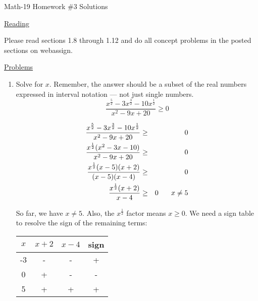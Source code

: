 \documentclass[letterpaper,12pt,fleqn]{article}
\begin{document}
\begin{center}
\Large Math-19 Homework \#3 Solutions
\end{center}

\vspace{0.5in}

\underline{Reading}

Please read sections 1.8 through 1.12 and do all concept problems in the posted
sections on web\-assign.

\underline{Problems}

\begin{enumerate}
\item Solve for $x$.  Remember, the answer should be a subset of the real
numbers expressed in interval notation --- not just single numbers.
\[\frac{x^{\frac{5}{2}}-3x^{\frac{3}{2}}-10x^{\frac{1}{2}}}{x^2-9x+20}\ge0\]

\begin{eqnarray*}
\frac{x^{\frac{5}{2}}-3x^{\frac{3}{2}}-10x^{\frac{1}{2}}}{x^2-9x+20} &\ge& 0 \\
\frac{x^{\frac{1}{2}}(x^2-3x-10)}{x^2-9x+20} &\ge& 0 \\
\frac{x^{\frac{1}{2}}(x-5)(x+2)}{(x-5)(x-4)} &\ge& 0 \\
\frac{x^{\frac{1}{2}}(x+2)}{x-4} &\ge& 0\hspace{0.25in}x\ne5 \\
\end{eqnarray*}

So far, we have $x\ne5$. Also, the $x^{\frac{1}{2}}$ factor means $x\ge0$. We need
a sign table to resolve the sign of the remaining terms:


\begin{tabular}{|c|c|c|c|}
\hline
$x$ & $x+2$ & $x-4$ & sign \\
\hline
-3 & - & - & + \\
\hline
0 & + & - & - \\
\hline
5 & + & + & + \\
\hline
\end{tabular}


\end{enumerate}
\end{document}
